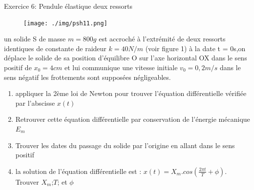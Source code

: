 \documentclass[12pt, french]{article}
\begin{document}
\begin{Box2}{Exercice 6: Pendule élastique deux ressorts}
  \begin{figure}
  \begin{center}
	  \vspace{-0.6cm}
	\texttt{[image: ./img/psh11.png]}
  \end{center}
\end{figure}
  un solide S de masse $m = 800g$ est accroché à l’extrémité de deux ressorts identiques de constante de raideur
  $k = 40N/m$ (voir figure 1)
à la date t = 0s,on déplace le solide de sa position d’équilibre O sur l’axe horizontal OX dans le sens positif de
  $x_0 = 4cm$ et lui communique une vitesse initiale $v_0 = 0, 2m/s$ dans le sens négatif les frottements sont supposées
négligeables.
\begin{enumerate}
  \item appliquer la 2ème loi de Newton pour trouver l’équation différentielle vérifiée par l’abscisse $x(t)$
  \item Retrouver cette équation différentielle par conservation de l’énergie
mécanique $E_m$
\item Trouver les dates du passage du solide par l’origine en allant dans le sens
positif
\item  la solution de l’équation différentielle est : $x(t) = X_m.cos(\frac{2\pi t}{T} + \phi)$. Trouver $X_m$;$T$; et $\phi$
\end{enumerate}
\end{Box2}
\end{document}
